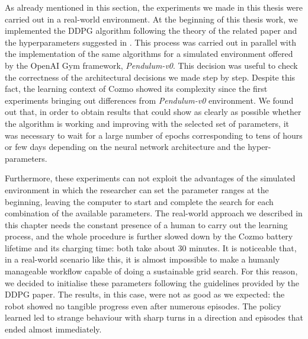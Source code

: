 As already mentioned in this section, the experiments we made in this thesis were carried out in a real-world environment.
At the beginning of this thesis work, we implemented the DDPG algorithm following the theory of the related paper and the hyperparameters suggested in \cite{lillicrap2015continuous,kendall2018learning,kendall2019learning}.
This process was carried out in parallel with the implementation of the same algorithms for a simulated environment offered by the OpenAI Gym framework, \textit{Pendulum-v0}.
This decision was useful to check the correctness of the architectural decisions we made step by step.
Despite this fact, the learning context of Cozmo showed its complexity since the first experiments bringing out differences from \textit{Pendulum-v0} environment.
We found out that, in order to obtain results that could show as clearly as possible whether the algorithm is working and improving with the selected set of parameters, it was necessary to wait for a large number of epochs corresponding to tens of hours or few days depending on the neural network architecture and the hyper-parameters.

Furthermore, these experiments can not exploit the advantages of the simulated environment in which the researcher can set the parameter ranges at the beginning, leaving the computer to start and complete the search for each combination of the available parameters.
The real-world approach we described in this chapter needs the constant presence of a human to carry out the learning process, and the whole procedure is further slowed down by the Cozmo battery lifetime and its charging time: both take about 30 minutes.
It is noticeable that, in a real-world scenario like this, it is almost impossible to make a humanly manageable workflow capable of doing a sustainable grid search.
For this reason, we decided to initialise these parameters following the guidelines provided by the DDPG paper.
The results, in this case, were not as good as we expected: the robot showed no tangible progress even after numerous episodes.
The policy learned led to strange behaviour with sharp turns in a direction and episodes that ended almost immediately.


